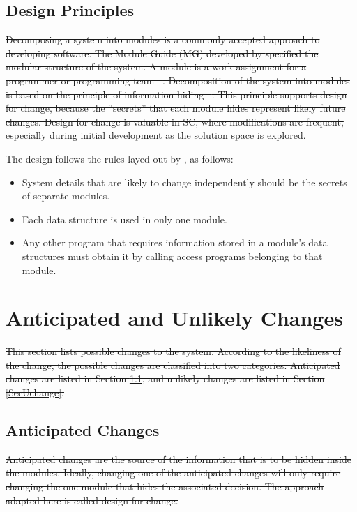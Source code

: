\documentclass[12pt, titlepage]{article}
\begin{document}
\subsection{Design Principles}
\sout{Decomposing a system into modules is a commonly accepted approach to developing
software.  The Module Guide (MG) developed by \mbox{\citep{ParnasEtAl1984}} specified the modular structure of the system. A module is a work assignment for a programmer or programming team \mbox{~\citep{ParnasEtAl1984}}.  Decomposition of the system into modules is
based on the principle of information hiding \mbox{~\citep{Parnas1972a}}.  This
principle supports design for change, because the ``secrets'' that each module
hides represent likely future changes.  Design for change is valuable in SC,
where modifications are frequent, especially during initial development as the
solution space is explored.\\}

The design follows the rules layed out by \citet{ParnasEtAl1984}, as follows:
\begin{itemize}
\item System details that are likely to change independently should be the
  secrets of separate modules.
\item Each data structure is used in only one module.
\item Any other program that requires information stored in a module's data
  structures must obtain it by calling access programs belonging to that module.
\end{itemize}

\section{Anticipated and Unlikely Changes} \label{SecChange}

\sout{This section lists possible changes to the system. According to the likeliness of the change, the possible changes are classified into two categories. Anticipated changes are listed in Section \ref{SecAchange}, and unlikely changes are listed in Section \ref{SecUchange}.}

\subsection{Anticipated Changes} \label{SecAchange}
\sout{Anticipated changes are the source of the information that is to be hidden inside the modules. Ideally, changing one of the anticipated changes will only require changing the one module that hides the associated decision. The approach adapted here is called design for change.}
\end{document}

